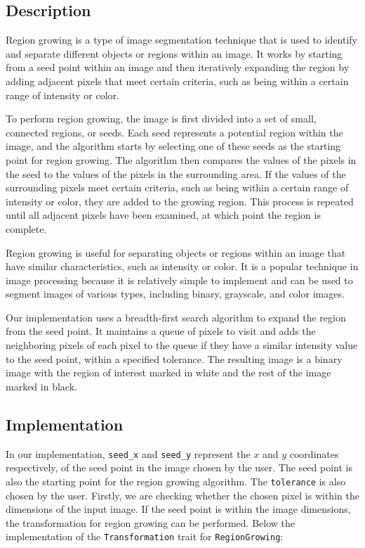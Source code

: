 \documentclass[12pt]{article}
\begin{document}
\subsection{Description}
Region growing is a type of image segmentation technique that is used to identify and separate different objects or regions within an image. It works by starting from a seed point within an image and then iteratively expanding the region by adding adjacent pixels that meet certain criteria, such as being within a certain range of intensity or color.

To perform region growing, the image is first divided into a set of small, connected regions, or seeds. Each seed represents a potential region within the image, and the algorithm starts by selecting one of these seeds as the starting point for region growing. The algorithm then compares the values of the pixels in the seed to the values of the pixels in the surrounding area. If the values of the surrounding pixels meet certain criteria, such as being within a certain range of intensity or color, they are added to the growing region. This process is repeated until all adjacent pixels have been examined, at which point the region is complete.

Region growing is useful for separating objects or regions within an image that have similar characteristics, such as intensity or color. It is a popular technique in image processing because it is relatively simple to implement and can be used to segment images of various types, including binary, grayscale, and color images.

Our implementation uses a breadth-first search algorithm to expand the region from the seed point. It maintains a queue of pixels to visit and adds the neighboring pixels of each pixel to the queue if they have a similar intensity value to the seed point, within a specified tolerance. The resulting image is a binary image with the region of interest marked in white and the rest of the image marked in black.

\subsection{Implementation}

In our implementation, \lstinline{seed_x} and \lstinline{seed_y} represent the $x$ and $y$ coordinates respectively,
of the seed point in the image chosen by the user.
The seed point is also the starting point for the region growing algorithm.
The \lstinline{tolerance} is also chosen by the user.
Firstly, we are checking whether the chosen pixel is within the dimensions of the input image.
If the seed point is within the image dimensions,
the transformation for region growing can be performed.
Below the implementation of the \lstinline{Transformation} trait for \lstinline{RegionGrowing}:
\end{document}

